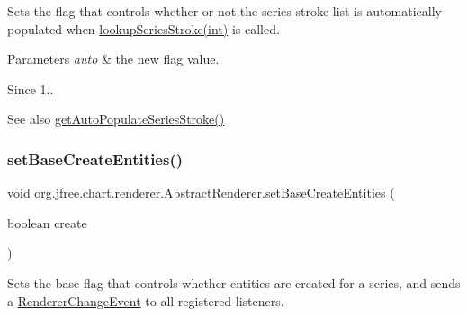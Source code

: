 Sets the flag that controls whether or not the series stroke list is automatically populated when \mbox{\hyperlink{classorg_1_1jfree_1_1chart_1_1renderer_1_1_abstract_renderer_a883eab51fd555ce119249384790c6d10}{lookup\+Series\+Stroke(int)}} is called.


\begin{DoxyParams}{Parameters}
{\em auto} & the new flag value.\\
\hline
\end{DoxyParams}
\begin{DoxySince}{Since}
1..
\end{DoxySince}
\begin{DoxySeeAlso}{See also}
\mbox{\hyperlink{classorg_1_1jfree_1_1chart_1_1renderer_1_1_abstract_renderer_adbbbcbf044e84a629e488d904f88442e}{get\+Auto\+Populate\+Series\+Stroke()}} 
\end{DoxySeeAlso}
\mbox{\label{classorg_1_1jfree_1_1chart_1_1renderer_1_1_abstract_renderer_a7f6e0858465a3692ee7e9fd580ca0c3a}} 
\subsubsection{\texorpdfstring{set\+Base\+Create\+Entities()}{setBaseCreateEntities()}\hspace{0.1cm}{\footnotesize\ttfamily [1/2]}}
{\footnotesize\ttfamily void org.\+jfree.\+chart.\+renderer.\+Abstract\+Renderer.\+set\+Base\+Create\+Entities (\begin{DoxyParamCaption}\item[{boolean}]{create }\end{DoxyParamCaption})}

Sets the base flag that controls whether entities are created for a series, and sends a \mbox{\hyperlink{}{Renderer\+Change\+Event}} to all registered listeners.



